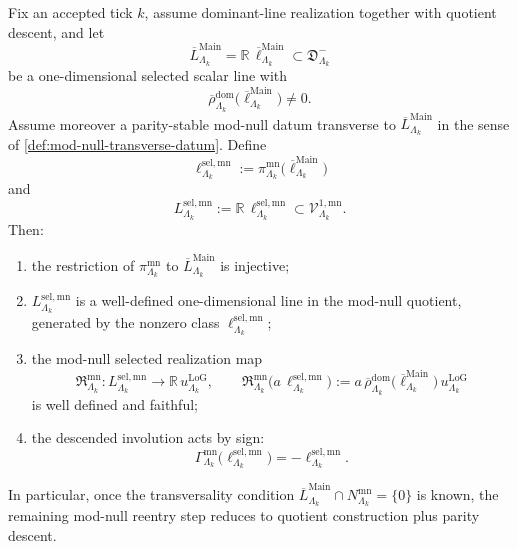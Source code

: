 \documentclass[11pt]{article}
\begin{document}
\begin{lemma}
\label{lem:mod-null-transversality-reduction}
Fix an accepted tick \(k\), assume dominant-line realization together with quotient descent, and let
\[
\overline L^{\mathrm{Main}}_{\Lambda_k}
=
\mathbb R\,\overline\ell^{\mathrm{Main}}_{\Lambda_k}
\subset
\mathfrak D^-_{\Lambda_k}
\]
be a one-dimensional selected scalar line with
\[
\overline{\rho}^{\mathrm{dom}}_{\Lambda_k}
\!\bigl(
\overline\ell^{\mathrm{Main}}_{\Lambda_k}
\bigr)
\neq 0.
\]
Assume moreover a parity-stable mod-null datum transverse to
\(
\overline L^{\mathrm{Main}}_{\Lambda_k}
\)
in the sense of \cref{def:mod-null-transverse-datum}.
Define
\[
\ell^{\mathrm{sel,mn}}_{\Lambda_k}
:=
\pi^{\mathrm{mn}}_{\Lambda_k}
\!\bigl(
\overline\ell^{\mathrm{Main}}_{\Lambda_k}
\bigr)
\]
and
\[
L^{\mathrm{sel,mn}}_{\Lambda_k}
:=
\mathbb R\,\ell^{\mathrm{sel,mn}}_{\Lambda_k}
\subset
\mathcal V^{1,\mathrm{mn}}_{\Lambda_k}.
\]
Then:
\begin{enumerate}[leftmargin=2em]
\item the restriction of
  \(
  \pi^{\mathrm{mn}}_{\Lambda_k}
  \)
  to
  \(
  \overline L^{\mathrm{Main}}_{\Lambda_k}
  \)
  is injective;
\item \(L^{\mathrm{sel,mn}}_{\Lambda_k}\) is a well-defined one-dimensional line in the mod-null
  quotient, generated by the nonzero class
  \(
  \ell^{\mathrm{sel,mn}}_{\Lambda_k}
  \);
\item the mod-null selected realization map
  \[
  \mathfrak R^{\mathrm{mn}}_{\Lambda_k}:
  L^{\mathrm{sel,mn}}_{\Lambda_k}
  \longrightarrow
  \mathbb R\,u^{\mathrm{LoG}}_{\Lambda_k},
  \qquad
  \mathfrak R^{\mathrm{mn}}_{\Lambda_k}
  \!\bigl(
  a\,\ell^{\mathrm{sel,mn}}_{\Lambda_k}
  \bigr)
  :=
  a\,
  \overline{\rho}^{\mathrm{dom}}_{\Lambda_k}
  \!\bigl(
  \overline\ell^{\mathrm{Main}}_{\Lambda_k}
  \bigr)\,
  u^{\mathrm{LoG}}_{\Lambda_k}
  \]
  is well defined and faithful;
\item the descended involution acts by sign:
  \[
  \Gamma^{\mathrm{mn}}_{\Lambda_k}
  \!\bigl(
  \ell^{\mathrm{sel,mn}}_{\Lambda_k}
  \bigr)
  =
  -
  \ell^{\mathrm{sel,mn}}_{\Lambda_k}.
  \]
\end{enumerate}
In particular, once the transversality condition
\(
\overline L^{\mathrm{Main}}_{\Lambda_k}\cap N^{\mathrm{mn}}_{\Lambda_k}=\{0\}
\)
is known, the remaining mod-null reentry step reduces to quotient construction plus parity descent.
\end{lemma}
\end{document}
